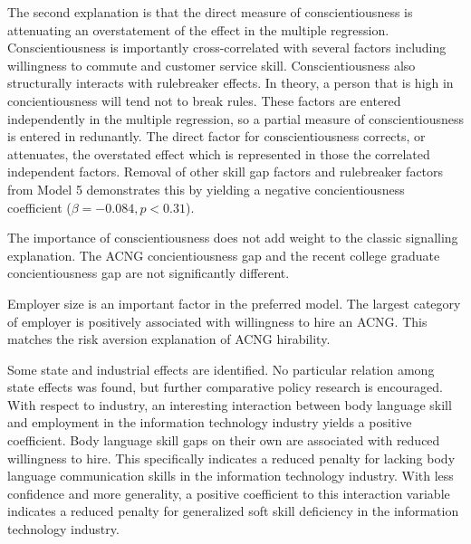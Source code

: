 \documentclass[review]{elsarticle}
\begin{document}
The second explanation is that the direct measure of conscientiousness is attenuating an overstatement of the effect in the multiple regression.
Conscientiousness is importantly cross-correlated with several factors including willingness to commute and customer service skill.
Conscientiousness also structurally interacts with rulebreaker effects.
In theory, a person that is high in concientiousness will tend not to break rules.
These factors are entered independently in the multiple regression, so a partial measure of conscientiousness is entered in redunantly.
The direct factor for conscientiousness corrects, or attenuates, the overstated effect which is represented in those the correlated independent factors.
Removal of other skill gap factors and rulebreaker factors from Model 5 demonstrates this by yielding a negative concientiousness coefficient ($\beta = -0.084, p < 0.31$).

The importance of conscientiousness does not add weight to the classic signalling explanation.
The ACNG concientiousness gap and the recent college graduate concientiousness gap are not significantly different.

Employer size is an important factor in the preferred model.
The largest category of employer is positively associated with willingness to hire an ACNG.
This matches the risk aversion explanation of ACNG hirability.

Some state and industrial effects are identified.
No particular relation among state effects was found, but further comparative policy research is encouraged.
With respect to industry, an interesting interaction between body language skill and employment in the information technology industry yields a positive coefficient.
Body language skill gaps on their own are associated with reduced willingness to hire.
This specifically indicates a reduced penalty for lacking body language communication skills in the information technology industry.
With less confidence and more generality, a positive coefficient to this interaction variable indicates a reduced penalty for generalized soft skill deficiency in the information technology industry.
\end{document}
